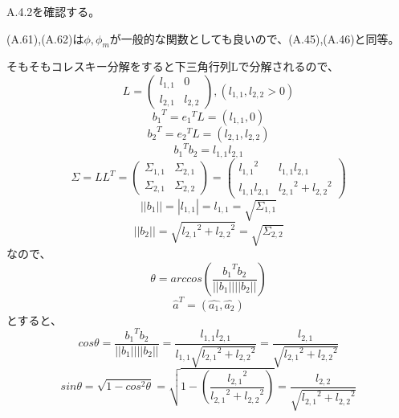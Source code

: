 \documentclass{jsarticle}
\begin{document}
A.4.2を確認する。

(A.61),(A.62)は$\phi, \phi_m$が一般的な関数としても良いので、(A.45),(A.46)と同等。

そもそもコレスキー分解をすると下三角行列Lで分解されるので、
\begin{equation}
L = \begin{pmatrix}
l_{1, 1} & 0\\
l_{2, 1} & l_{2, 2}
\end{pmatrix},
(l_{1, 1}, l_{2, 2} > 0)
\end{equation}
\begin{equation}
{b_1}^T = {e_1}^T L = (l_{1, 1}, 0)
\end{equation}
\begin{equation}
{b_2}^T = {e_2}^T L = (l_{2, 1}, l_{2, 2})
\end{equation}
\begin{equation}
{b_1}^T b_2 = l_{1, 1}l_{2, 1}
\end{equation}
\begin{equation}
\Sigma = LL^T =  
\begin{pmatrix}
\Sigma_{1,1} & \Sigma_{2,1}\\
\Sigma_{2,1} & \Sigma_{2,2}
\end{pmatrix}
=
\begin{pmatrix}
{l_{1,1}}^2 & l_{1,1}l_{2,1}\\
l_{1,1}l_{2,1} & {l_{2,1}}^2 + {l_{2,2}}^2
\end{pmatrix}
\end{equation}
\begin{equation}
||{b_1}|| = |l_{1, 1}| = l_{1, 1} = \sqrt{\Sigma_{1,1}}
\end{equation}
\begin{equation}
||{b_2}|| = \sqrt{{l_{2, 1}}^2 + {l_{2, 2}}^2} = \sqrt{\Sigma_{2,2}}
\end{equation}
なので、
\begin{equation}
\theta = arccos(\frac{{b_1}^Tb_2}{||b_1|| ||b_2||})
\end{equation}
\begin{equation}
\hat{a}^T = (\hat{a_1}, \hat{a_2})
\end{equation}
とすると、
\begin{equation}
cos \theta = \frac{{b_1}^Tb_2}{||b_1|| ||b_2||} = \frac{l_{1, 1} l_{2, 1}}{l_{1, 1} \sqrt{{l_{2, 1}}^2 + {l_{2, 2}}^2}}
= \frac{l_{2, 1}}{\sqrt{{l_{2, 1}}^2 + {l_{2, 2}}^2}}
\end{equation}
\begin{equation}
sin \theta = \sqrt{1 - cos^2 \theta} = \sqrt{1 - (\frac{{l_{2,1}}^2}{{l_{2,1}}^2 + {l_{2,2}}^2})}
= \frac{l_{2,2}}{\sqrt{{l_{2,1}}^2 + {l_{2,2}}^2}}
\end{equation}
\end{document}
